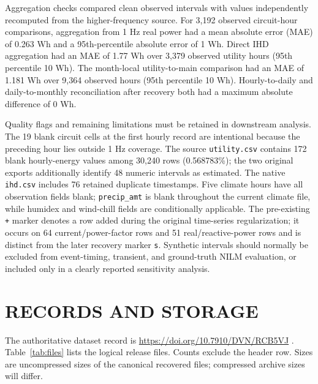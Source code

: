 \documentclass{IEEEoj-data}
\begin{document}
Aggregation checks compared clean observed intervals with values independently recomputed from the higher-frequency source. For 3,192 observed circuit-hour comparisons, aggregation from 1 Hz real power had a mean absolute error (MAE) of 0.263 Wh and a 95th-percentile absolute error of 1 Wh. Direct IHD aggregation had an MAE of 1.77 Wh over 3,379 observed utility hours (95th percentile 10 Wh). The month-local utility-to-main comparison had an MAE of 1.181 Wh over 9,364 observed hours (95th percentile 10 Wh). Hourly-to-daily and daily-to-monthly reconciliation after recovery both had a maximum absolute difference of 0 Wh.

Quality flags and remaining limitations must be retained in downstream analysis. The 19 blank circuit cells at the first hourly record are intentional because the preceding hour lies outside 1 Hz coverage. The source \texttt{utility.csv} contains 172 blank hourly-energy values among 30,240 rows (0.568783\%); the two original exports additionally identify 48 numeric intervals as estimated. The native \texttt{ihd.csv} includes 76 retained duplicate timestamps. Five climate hours have all observation fields blank; \texttt{precip\_amt} is blank throughout the current climate file, while humidex and wind-chill fields are conditionally applicable. The pre-existing \texttt{+} marker denotes a row added during the original time-series regularization; it occurs on 64 current/power-factor rows and 51 real/reactive-power rows and is distinct from the later recovery marker \texttt{s}. Synthetic intervals should normally be excluded from event-timing, transient, and ground-truth NILM evaluation, or included only in a clearly reported sensitivity analysis.

\section*{RECORDS AND STORAGE}
The authoritative dataset record is \href{https://doi.org/10.7910/DVN/RCB5VJ}{https://doi.org/10.7910/DVN/RCB5VJ} \cite{r1hzdata}. Table~\ref{tab:files} lists the logical release files. Counts exclude the header row. Sizes are uncompressed sizes of the canonical recovered files; compressed archive sizes will differ.
\end{document}
